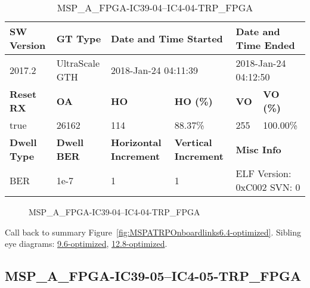 \begin{table}[h]
\centering
\caption{MSP\_A\_FPGA-IC39-04--IC4-04-TRP\_FPGA}
\label{tab:MSPAFPGAIC3904IC404TRPFPGA6.4-optimized}
\begin{tabular}{@{}|l|l|l|l|l|l|@{}}
\toprule
\textbf{SW Version}                & \textbf{GT Type}   & \multicolumn{2}{l|}{\textbf{Date and Time Started}}            & \multicolumn{2}{l|}{\textbf{Date and Time Ended}}        \\ \midrule
2017.2                       & UltraScale GTH          & \multicolumn{2}{l|}{2018-Jan-24 04:11:39}                   & \multicolumn{2}{l|}{2018-Jan-24 04:12:50}               \\ \midrule
\textbf{Reset RX}                  & \textbf{OA} & \textbf{HO}   & \textbf{HO (\%)} & \textbf{VO} & \textbf{VO (\%)} \\ \midrule
true & 26162        & 114          & 88.37\%        & 255        & 100.00\%       \\ \midrule
\textbf{Dwell Type}                & \textbf{Dwell BER} & \textbf{Horizontal Increment} & \textbf{Vertical Increment}    & \multicolumn{2}{l|}{\textbf{Misc Info}}                  \\ \midrule
BER                            & 1e-7        & 1        & 1           & \multicolumn{2}{l|}{ELF Version: 0xC002 SVN: 0}                         \\ \bottomrule
\end{tabular}
\end{table}

\begin{figure}[h]
\caption{MSP\_A\_FPGA-IC39-04--IC4-04-TRP\_FPGA} \label{fig:MSPAFPGAIC3904IC404TRPFPGA6.4-optimized}
\end{figure}

Call back to summary Figure~\ref{fig:MSPATRPOnboardlinks6.4-optimized}.
Sibling eye diagrams: \hyperref[sec:MSPAFPGAIC3904IC404TRPFPGA9.6-optimized]{9.6-optimized}, \hyperref[sec:MSPAFPGAIC3904IC404TRPFPGA12.8-optimized]{12.8-optimized}.

\clearpage
\newpage


\subsection{MSP\_A\_FPGA-IC39-05--IC4-05-TRP\_FPGA}\label{sec:MSPAFPGAIC3905IC405TRPFPGA6.4-optimized}

